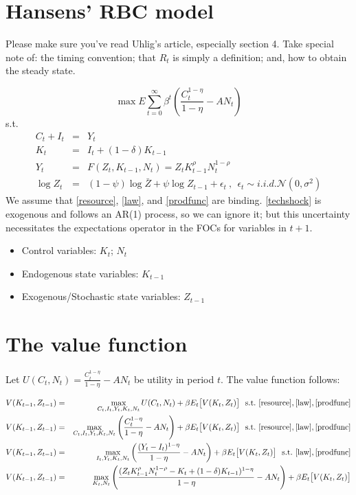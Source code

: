 \section*{Hansens' RBC model}
Please make sure you've read Uhlig's article, especially section 4. Take special note of: the timing convention; that $R_t$ is simply a definition; and, how to obtain the steady state.

\begin{equation}
\max E \sum^{\infty}_{t=0} \beta^{t} \left( \frac{C^{1-\eta}_t}{1-\eta} - A N_t   \right)
\end{equation}
s.t.
\begin{eqnarray} \label{resource}
C_t + I_t &=& Y_t \\ \label{law}
K_t &=& I_t + (1-\delta)K_{t-1}\\ \label{prodfunc}
Y_t &=& F(Z_t,K_{t-1},N_t) = Z_t K^{\rho}_{t-1} N^{1-\rho}_t \\ \label{techshock}
\log{Z}_t &=& (1-{\psi})\log{\bar{Z}} + {\psi}\log{Z}_{t-1} + \epsilon_t ~,~~ \epsilon_t \sim i.i.d.\mathcal{N}(0,\sigma^2)
\end{eqnarray}
We assume that \eqref{resource}, \eqref{law}, and \eqref{prodfunc} are binding.  \eqref{techshock} is exogenous and follows an AR(1) process, so we can ignore it; but this uncertainty necessitates the expectations operator in the FOCs for variables in $t+1$.
\begin{itemize}
\item Control variables: $K_t$; $N_t$ 
\item Endogenous state variables: $K_{t-1}$
\item Exogenous/Stochastic state variables: $Z_{t-1}$ 
\end{itemize}


\section{The value function}
Let $U(C_t,N_t) = \frac{C^{1-\eta}_t}{1-\eta} - {A}N_t$ be utility in period $t$. The value function follows:

\begin{eqnarray} \nonumber
V(K_{t-1},Z_{t-1}) &=& \max_{C_t,I_t,Y_t,K_t,N_t} U(C_t,N_t) + \beta E_t   \bigl[ V(K_{t},Z_{t})   \big] ~~ {\text{s.t.}}~  \eqref{resource}, \eqref{law}, \eqref{prodfunc}  \\ \nonumber
V(K_{t-1},Z_{t-1}) &=& \max_{C_t,I_t,Y_t,K_t,N_t} \left( \frac{C^{1-\eta}_t}{1-\eta} - A N_t   \right) + \beta E_t   \bigl[ V(K_{t},Z_{t})   \big] ~~ {\text{s.t.}}~  \eqref{resource}, \eqref{law}, \eqref{prodfunc}  \\ \nonumber
V(K_{t-1},Z_{t-1}) &=& \max_{I_t,Y_t,K_t,N_t} \left( \frac{(Y_t - I_t)^{1-\eta}}{1-\eta} - A N_t   \right) + \beta E_t   \bigl[ V(K_{t},Z_{t})   \big]  ~~ {\text{s.t.}}~  \eqref{law}, \eqref{prodfunc}  \\ \nonumber
V(K_{t-1},Z_{t-1}) &=& \max_{K_t,N_t} \left( \frac{(Z_t K^{\rho}_{t-1} N^{1-\rho}_t - K_t + (1-\delta)K_{t-1})^{1-\eta}}{1-\eta} - A N_t   \right) + \beta E_t   \bigl[ V(K_{t},Z_{t})   \big] 
\end{eqnarray}


